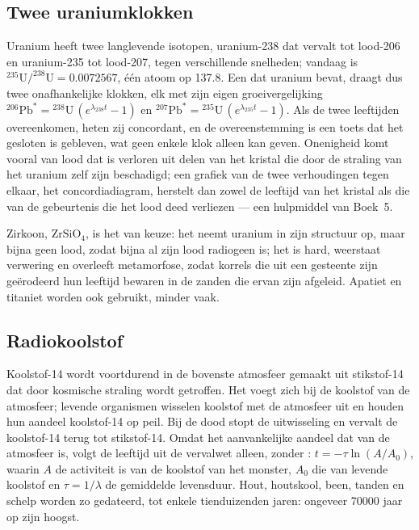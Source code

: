 \subsection*{Twee uraniumklokken}

Uranium heeft twee langlevende isotopen, uranium-238 dat vervalt tot lood-206 en uranium-235 tot lood-207, tegen verschillende snelheden; vandaag is $^{235}\mathrm{U}/^{238}\mathrm{U} = 0.0072567$, één atoom op 137.8. Een  dat uranium bevat, draagt dus twee onafhankelijke klokken, elk met zijn eigen groeivergelijking ${}^{206}\mathrm{Pb}^* = {}^{238}\mathrm{U}\,(e^{\lambda_{238} t} - 1)$ en ${}^{207}\mathrm{Pb}^* = {}^{235}\mathrm{U}\,(e^{\lambda_{235} t} - 1)$. Als de twee leeftijden overeenkomen, heten zij concordant, en de overeenstemming is een toets dat het  gesloten is gebleven, wat geen enkele klok alleen kan geven. Onenigheid komt vooral van lood dat is verloren uit delen van het kristal die door de straling van het uranium zelf zijn beschadigd; een grafiek van de twee verhoudingen tegen elkaar, het concordiadiagram, herstelt dan zowel de leeftijd van het kristal als die van de gebeurtenis die het lood deed verliezen --- een hulpmiddel van Boek~5.

Zirkoon, $\mathrm{ZrSiO_4}$, is het  van keuze: het neemt uranium in zijn structuur op, maar bijna geen lood, zodat bijna al zijn lood radiogeen is; het is hard, weerstaat verwering en overleeft metamorfose, zodat korrels die uit een gesteente zijn geërodeerd hun leeftijd bewaren in de zanden die ervan zijn afgeleid. Apatiet en titaniet worden ook gebruikt, minder vaak.

\subsection*{Radiokoolstof}

Koolstof-14 wordt voortdurend in de bovenste atmosfeer gemaakt uit stikstof-14 dat door kosmische straling wordt getroffen. Het voegt zich bij de koolstof van de atmosfeer; levende organismen wisselen koolstof met de atmosfeer uit en houden hun aandeel koolstof-14 op peil. Bij de dood stopt de uitwisseling en vervalt de koolstof-14 terug tot stikstof-14. Omdat het aanvankelijke aandeel dat van de atmosfeer is, volgt de leeftijd uit de vervalwet alleen, zonder : $t = -\tau \ln(A/A_0)$, waarin $A$ de activiteit is van de koolstof van het monster, $A_0$ die van levende koolstof en $\tau =
1/\lambda$ de gemiddelde levensduur. Hout, houtskool, been, tanden en schelp worden zo gedateerd, tot enkele tienduizenden jaren: ongeveer \num{70000} jaar op zijn hoogst.

